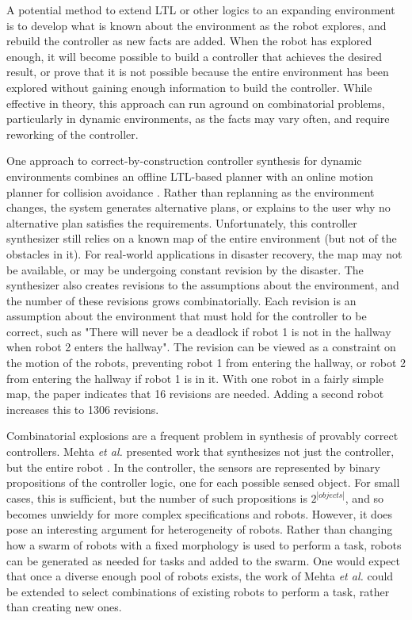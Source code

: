 A potential method to extend LTL or other logics to an expanding environment is to develop what is known about the environment as the robot explores, and rebuild the controller as new facts are added. 
When the robot has explored enough, it will become possible to build a controller that achieves the desired result, or prove that it is not possible because the entire environment has been explored without gaining enough information to build the controller. 
While effective in theory, this approach can run aground on combinatorial problems, particularly in dynamic environments, as the facts may vary often, and require reworking of the controller. 

One approach to correct-by-construction controller synthesis for dynamic environments combines an offline LTL-based planner with an online motion planner for collision avoidance \citep{alonso2018reactive}. 
Rather than replanning as the environment changes, the system generates alternative plans, or explains to the user why no alternative plan satisfies the requirements.  
Unfortunately, this controller synthesizer still relies on a known map of the entire environment (but not of the obstacles in it). 
For real-world applications in disaster recovery, the map may not be available, or may be undergoing constant revision by the disaster. 
The synthesizer also creates revisions to the assumptions about the environment, and the number of these revisions grows combinatorially. 
Each revision is an assumption about the environment that must hold for the controller to be correct, such as "There will never be a deadlock if robot 1 is not in the hallway when robot 2 enters the hallway".
The revision can be viewed as a constraint on the motion of the robots, preventing robot 1 from entering the hallway, or robot 2 from entering the hallway if robot 1 is in it. 
With one robot in a fairly simple map, the paper indicates that 16 revisions are needed. 
Adding a second robot increases this to 1306 revisions.  

Combinatorial explosions are a frequent problem in synthesis of provably correct controllers. 
Mehta \emph{et al.} presented work that synthesizes not just the controller, but the entire robot \citep{mehta2018robot}.
In the controller, the sensors are represented by binary propositions of the controller logic, one for each possible sensed object.
For small cases, this is sufficient, but the number of such propositions is $2^{|objects|}$, and so becomes unwieldy for more complex specifications and robots.  
However, it does pose an interesting argument for heterogeneity of robots. 
Rather than changing how a swarm of robots with a fixed morphology is used to perform a task, robots can be generated as needed for tasks and added to the swarm. 
One would expect that once a diverse enough pool of robots exists, the work of Mehta \emph{et al.} could be extended to select combinations of existing robots to perform a task, rather than creating new ones. 

